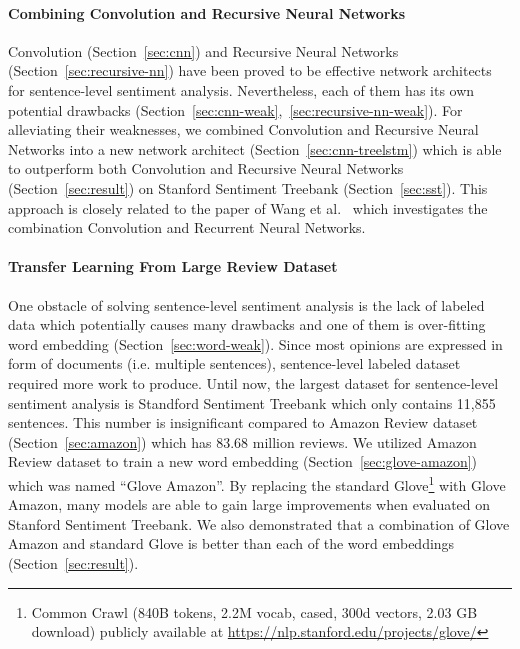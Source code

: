 \paragraph{Combining Convolution and Recursive Neural Networks}Convolution (Section~\ref{sec:cnn}) and Recursive Neural Networks (Section~\ref{sec:recursive-nn}) have been proved to be effective network architects for sentence-level sentiment analysis.
	Nevertheless, each of them has its own potential drawbacks (Section~\ref{sec:cnn-weak},~\ref{sec:recursive-nn-weak}).
	For alleviating their weaknesses, we combined Convolution and Recursive Neural Networks into a new network architect (Section~\ref{sec:cnn-treelstm}) which is able to outperform both Convolution and Recursive Neural Networks (Section~\ref{sec:result}) on Stanford Sentiment Treebank (Section~\ref{sec:sst}).
	This approach is closely related to the paper of Wang et al.~\cite{cnn-rnn} which investigates the combination Convolution and Recurrent Neural Networks.
\paragraph{Transfer Learning From Large Review Dataset} One obstacle of solving sentence-level sentiment analysis is the lack of labeled data which potentially causes many drawbacks and one of them is over-fitting word embedding (Section~\ref{sec:word-weak}).
	Since most opinions are expressed in form of  documents (i.e. multiple sentences), sentence-level labeled dataset required more work to produce.
	Until now, the largest dataset for sentence-level sentiment analysis is Standford Sentiment Treebank which only contains 11,855 sentences.
	This number is insignificant compared to Amazon Review dataset (Section~\ref{sec:amazon}) which has 83.68 million reviews.
	We utilized Amazon Review dataset to train a new word embedding (Section~\ref{sec:glove-amazon}) which was named ``Glove Amazon''.
	By replacing the standard Glove\footnote{Common Crawl (840B tokens, 2.2M vocab, cased, 300d vectors, 2.03 GB download) publicly available at \url{https://nlp.stanford.edu/projects/glove/}} with Glove Amazon, many models are able to gain large improvements when evaluated on Stanford Sentiment Treebank.
	We also demonstrated that a combination of Glove Amazon and standard Glove is better than each of the word embeddings (Section~\ref{sec:result}).

